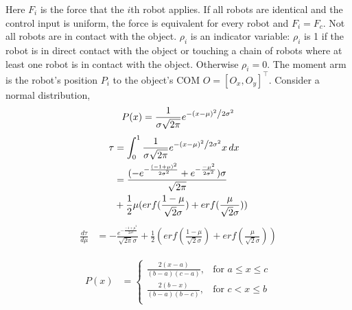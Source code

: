 Here $F_i$ is the force that the $i$th robot applies.  If all robots are identical and the control input is uniform, the force is equivalent for every robot and $F_i = F_c$.
Not all robots are in contact with the object.  $\rho_i$ is an indicator variable: $\rho_i$ is 1 if the robot is in direct contact with the object or touching a chain of robots where at least one robot is in contact with the object. Otherwise $\rho_i = 0$.
The moment arm is the robot's position $P_i$ to the object's COM $O=[O_x,O_y]^{\top}$.
Consider a normal distribution, 
\begin{equation}
P(x) = \frac{1}{{\sigma \sqrt {2\pi } }}e^{{{ - \left( {x - \mu } \right)^2 } \mathord{\left/ {\vphantom {{ - \left( {x - \mu } \right)^2 } {2\sigma ^2 }}} \right. \kern-\nulldelimiterspace} {2\sigma ^2 }}}
\end{equation}
\begin{align} \nonumber
\tau &= \int_0^1\frac{1}{{\sigma \sqrt {2\pi } }}e^{{{ - \left( {x - \mu } \right)^2 } \mathord{\left/ {\vphantom {{ - \left( {x - \mu } \right)^2 } {2\sigma ^2 }}} \right. \kern-\nulldelimiterspace} {2\sigma ^2 }}} x \, dx\\ \nonumber
&= \frac{(-e^{-\frac{(-1+\mu)^2}{2\sigma^2}}+e^{-\frac{-\mu^2}{2\sigma^2}})\sigma}{\sqrt{2\pi}}\\ 
&+ \frac{1}{2}\mu(erf(\frac{1-\mu}{\sqrt{2}\sigma})+erf(\frac{\mu}{\sqrt{2}\sigma})) 
\end{align}
\begin{align} 
\frac{d\tau}{d\mu} &= -\frac{e^{-\frac{{-1+\mu}^2}{2\sigma^2}}}{\sqrt{2\pi}\sigma} + \frac{1}{2}(erf(\frac{1-\mu}{\sqrt{2}\sigma})+erf(\frac{\mu}{\sqrt{2}\sigma})) 
\end{align}


\begin{align}
P(x) &=  \left\{
\begin{array}{ll}
    \frac{2(x-a)}{(b-a)(c-a)}, &  \textrm{for   } a \leq x \leq c\\
     \frac{2(b-x)}{(b-a)(b-c)}, &  \textrm{for   } c < x \leq b\\
\end{array} 
\right.
\end{align}
